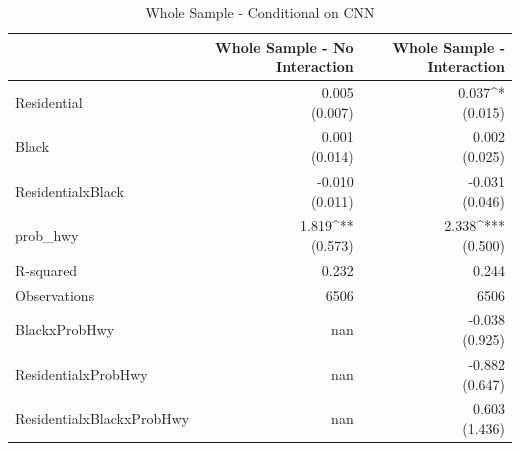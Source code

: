 \begin{table}[h]
\centering
\caption{Whole Sample - Conditional on CNN}
\label{tab:cnn_covariate_wholesample}
\begin{tabular*}{\textwidth}{@{\extracolsep{\fill}}l*{2}{r}}
\toprule
 & Whole Sample - No Interaction & Whole Sample - Interaction \\
\midrule
Residential & \makecell[tr]{0.005 \\ (0.007)} & \makecell[tr]{0.037^{*} \\ (0.015)} \\
Black & \makecell[tr]{0.001 \\ (0.014)} & \makecell[tr]{0.002 \\ (0.025)} \\
ResidentialxBlack & \makecell[tr]{-0.010 \\ (0.011)} & \makecell[tr]{-0.031 \\ (0.046)} \\
prob_hwy & \makecell[tr]{1.819^{**} \\ (0.573)} & \makecell[tr]{2.338^{***} \\ (0.500)} \\
R-squared & 0.232 & 0.244 \\
Observations & 6506 & 6506 \\
BlackxProbHwy & nan & \makecell[tr]{-0.038 \\ (0.925)} \\
ResidentialxProbHwy & nan & \makecell[tr]{-0.882 \\ (0.647)} \\
ResidentialxBlackxProbHwy & nan & \makecell[tr]{0.603 \\ (1.436)} \\
\bottomrule
\end{tabular*}
\end{table}
